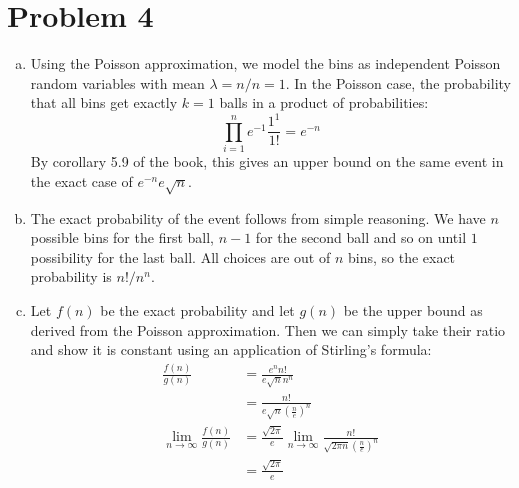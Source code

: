 \documentclass[11pt]{article}
\begin{document}
\newpage
\section*{Problem 4}
\begin{enumerate}[(a)]
\item Using the Poisson approximation, we model the bins as independent Poisson random variables with mean $\lambda = n/n = 1$. In the Poisson case, the probability that all bins get exactly $k=1$ balls in a product of probabilities:
$$\prod_{i=1}^ne^{-1}\frac{1^1}{1!}=e^{-n}$$
By corollary 5.9 of the book, this gives an upper bound on the same event in the exact case of $e^{-n}e\sqrt n$.
\item The exact probability of the event follows from simple reasoning. We have $n$ possible bins for the first ball, $n-1$ for the second ball and so on until $1$ possibility for the last ball. All choices are out of $n$ bins, so the exact probability is $n!/n^n$.
\item Let $f(n)$ be the exact probability and let $g(n)$ be the upper bound as derived from the Poisson approximation. Then we can simply take their ratio and show it is constant using an application of Stirling's formula: \begin{align*}
\frac{f(n)}{g(n)} &= \frac{e^nn!}{e\sqrt nn^n}\\
&= \frac{n!}{e\sqrt n (\frac ne)^n}\\
\lim_{n\rightarrow\infty} \frac{f(n)}{g(n)} &= \frac{\sqrt{2\pi}}e\lim_{n\rightarrow\infty}\frac{n!}{\sqrt {2\pi n} (\frac ne)^n}\\
&= \frac{\sqrt{2\pi}}e
\end{align*}
\end{enumerate}


\newpage
\end{document}
